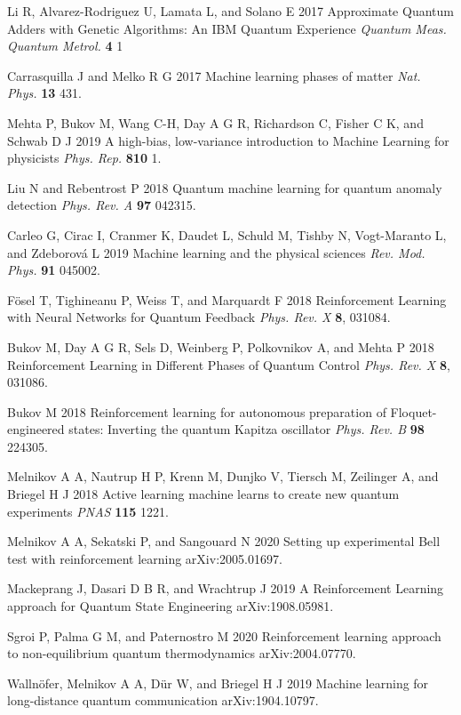 \documentclass[12pt]{iopart}
\begin{document}
\begin{thebibliography}{999}
 Li R, Alvarez-Rodriguez U, Lamata L, and Solano E 2017 Approximate Quantum Adders with Genetic Algorithms: An IBM Quantum Experience {\it Quantum Meas. Quantum Metrol.} {\bf 4} 1

 Carrasquilla J and Melko R G 2017 Machine learning phases of matter {\it Nat. Phys.} {\bf 13} 431.

 Mehta P, Bukov M, Wang C-H, Day A G R, Richardson C, Fisher C K, and Schwab D J 2019 A high-bias, low-variance introduction to Machine Learning for physicists {\it Phys. Rep.} {\bf 810} 1.

 Liu N and Rebentrost P 2018 Quantum machine learning for quantum anomaly detection
{\it Phys. Rev. A} {\bf 97} 042315.

 Carleo G, Cirac I, Cranmer K, Daudet L, Schuld M, Tishby N, Vogt-Maranto L, and Zdeborov\'a L 2019 Machine learning and the physical sciences {\it Rev. Mod. Phys.} {\bf 91} 045002.

 F\"osel T, Tighineanu P, Weiss T, and Marquardt F 2018 Reinforcement Learning with Neural Networks for Quantum Feedback {\it Phys. Rev. X} {\bf 8}, 031084.     

 Bukov M, Day A G R, Sels D, Weinberg P, Polkovnikov A, and Mehta P 2018 Reinforcement Learning in Different Phases of Quantum Control {\it Phys. Rev. X} {\bf 8}, 031086. 


 Bukov M 2018 Reinforcement learning for autonomous preparation of Floquet-engineered states: Inverting the quantum Kapitza oscillator {\it Phys. Rev. B} {\bf 98} 224305.

 Melnikov A A, Nautrup H P, Krenn M, Dunjko V, Tiersch M, Zeilinger A, and Briegel H J 2018 Active learning machine learns to create new quantum experiments {\it PNAS} {\bf 115} 1221.

  Melnikov A A, Sekatski P, and Sangouard N 2020 Setting up experimental Bell test with reinforcement learning arXiv:2005.01697.

 Mackeprang J, Dasari D B R, and Wrachtrup J 2019 A Reinforcement Learning approach for Quantum State Engineering arXiv:1908.05981.

 Sgroi P, Palma G M, and Paternostro M 2020 Reinforcement learning approach to non-equilibrium quantum thermodynamics arXiv:2004.07770.


 Walln\"ofer, Melnikov A A, D\"ur W, and Briegel H J 2019 Machine learning for long-distance quantum communication arXiv:1904.10797.


\end{thebibliography}
\end{document}

